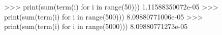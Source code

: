 
>>> print(sum(term(i) for i in range(50)))
1.11588350072e-05
>>> print(sum(term(i) for i in range(500)))
8.09880771006e-05
>>> print(sum(term(i) for i in range(5000)))
8.09880771273e-05
